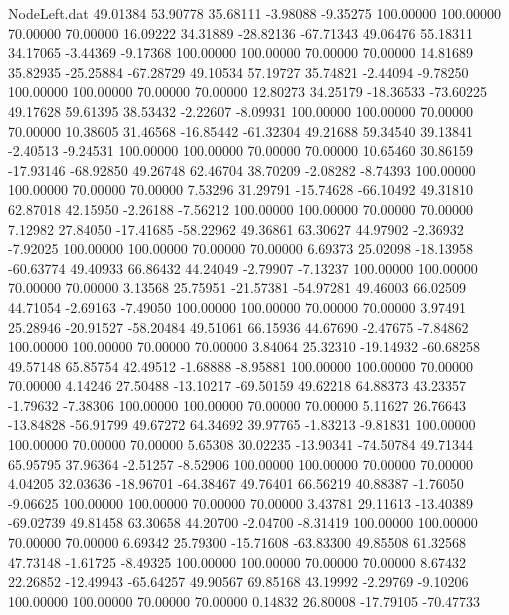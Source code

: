 \begin{filecontents}{NodeLeft.dat}
  49.01384   53.90778   35.68111    -3.98088   -9.35275  100.00000  100.00000   70.00000   70.00000   16.09222   34.31889  -28.82136  -67.71343
  49.06476   55.18311   34.17065    -3.44369   -9.17368  100.00000  100.00000   70.00000   70.00000   14.81689   35.82935  -25.25884  -67.28729
  49.10534   57.19727   35.74821    -2.44094   -9.78250  100.00000  100.00000   70.00000   70.00000   12.80273   34.25179  -18.36533  -73.60225
  49.17628   59.61395   38.53432    -2.22607   -8.09931  100.00000  100.00000   70.00000   70.00000   10.38605   31.46568  -16.85442  -61.32304
  49.21688   59.34540   39.13841    -2.40513   -9.24531  100.00000  100.00000   70.00000   70.00000   10.65460   30.86159  -17.93146  -68.92850
  49.26748   62.46704   38.70209    -2.08282   -8.74393  100.00000  100.00000   70.00000   70.00000    7.53296   31.29791  -15.74628  -66.10492
  49.31810   62.87018   42.15950    -2.26188   -7.56212  100.00000  100.00000   70.00000   70.00000    7.12982   27.84050  -17.41685  -58.22962
  49.36861   63.30627   44.97902    -2.36932   -7.92025  100.00000  100.00000   70.00000   70.00000    6.69373   25.02098  -18.13958  -60.63774
  49.40933   66.86432   44.24049    -2.79907   -7.13237  100.00000  100.00000   70.00000   70.00000    3.13568   25.75951  -21.57381  -54.97281
  49.46003   66.02509   44.71054    -2.69163   -7.49050  100.00000  100.00000   70.00000   70.00000    3.97491   25.28946  -20.91527  -58.20484
  49.51061   66.15936   44.67690    -2.47675   -7.84862  100.00000  100.00000   70.00000   70.00000    3.84064   25.32310  -19.14932  -60.68258
  49.57148   65.85754   42.49512    -1.68888   -8.95881  100.00000  100.00000   70.00000   70.00000    4.14246   27.50488  -13.10217  -69.50159
  49.62218   64.88373   43.23357    -1.79632   -7.38306  100.00000  100.00000   70.00000   70.00000    5.11627   26.76643  -13.84828  -56.91799
  49.67272   64.34692   39.97765    -1.83213   -9.81831  100.00000  100.00000   70.00000   70.00000    5.65308   30.02235  -13.90341  -74.50784
  49.71344   65.95795   37.96364    -2.51257   -8.52906  100.00000  100.00000   70.00000   70.00000    4.04205   32.03636  -18.96701  -64.38467
  49.76401   66.56219   40.88387    -1.76050   -9.06625  100.00000  100.00000   70.00000   70.00000    3.43781   29.11613  -13.40389  -69.02739
  49.81458   63.30658   44.20700    -2.04700   -8.31419  100.00000  100.00000   70.00000   70.00000    6.69342   25.79300  -15.71608  -63.83300
  49.85508   61.32568   47.73148    -1.61725   -8.49325  100.00000  100.00000   70.00000   70.00000    8.67432   22.26852  -12.49943  -65.64257
  49.90567   69.85168   43.19992    -2.29769   -9.10206  100.00000  100.00000   70.00000   70.00000    0.14832   26.80008  -17.79105  -70.47733

\end{filecontents}
